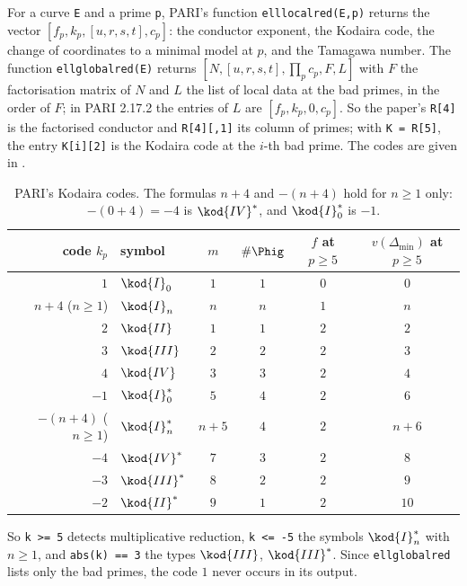 \begin{convention}\label{conv:reduction:pari-codes}
For a curve \texttt{E} and a prime \texttt{p}, PARI's function \texttt{elllocalred(E,p)} returns the vector $[f_p,k_p,[u,r,s,t],c_p]$: the
conductor exponent, the Kodaira code, the change of coordinates to a minimal model at $p$, and the Tamagawa number. The function
\texttt{ellglobalred(E)} returns $[N,[u,r,s,t],\prod_pc_p,F,L]$ with $F$ the factorisation matrix of $N$ and $L$ the list of local data at the bad
primes, in the order of $F$; in PARI 2.17.2 the entries of $L$ are $[f_p,k_p,0,c_p]$. So the paper's \texttt{R[4]} is the
factorised conductor and \texttt{R[4][,1]} its column of primes; with \texttt{K = R[5]}, the entry \texttt{K[i][2]} is the
Kodaira code at the $i$-th bad prime. The codes are given in .
\end{convention}

\begin{table}[ht]
\centering\small
\begin{tabular}{rlcccc}
\toprule
code $k_p$ & symbol & $m$ & $\#\Phig$ & $f$ at $p\ge5$ & $v(\Delta_{\min})$ at $p\ge5$\\
\midrule
$1$ & $\kod{I}_0$ & $1$ & $1$ & $0$ & $0$\\
$n+4$ ($n\ge1$) & $\kod{I}_n$ & $n$ & $n$ & $1$ & $n$\\
$2$ & $\kod{II}$ & $1$ & $1$ & $2$ & $2$\\
$3$ & $\kod{III}$ & $2$ & $2$ & $2$ & $3$\\
$4$ & $\kod{IV}$ & $3$ & $3$ & $2$ & $4$\\
$-1$ & $\kod{I}_0^*$ & $5$ & $4$ & $2$ & $6$\\
$-(n+4)$ ($n\ge1$) & $\kod{I}_n^*$ & $n+5$ & $4$ & $2$ & $n+6$\\
$-4$ & $\kod{IV}^*$ & $7$ & $3$ & $2$ & $8$\\
$-3$ & $\kod{III}^*$ & $8$ & $2$ & $2$ & $9$\\
$-2$ & $\kod{II}^*$ & $9$ & $1$ & $2$ & $10$\\
\bottomrule
\end{tabular}
\caption{PARI's Kodaira codes. The formulas $n+4$ and $-(n+4)$ hold for $n\ge1$ only: $-(0+4)=-4$ is $\kod{IV}^*$, and
$\kod{I}_0^*$ is $-1$.}\label{tab:reduction:codes}
\end{table}

So \texttt{k >= 5} detects multiplicative reduction, \texttt{k <= -5} the symbols $\kod{I}_n^*$ with $n\ge1$, and
\texttt{abs(k) == 3} the types $\kod{III}$, $\kod{III}^*$. Since \texttt{ellglobalred} lists only the bad primes, the code
$1$ never occurs in its output.

